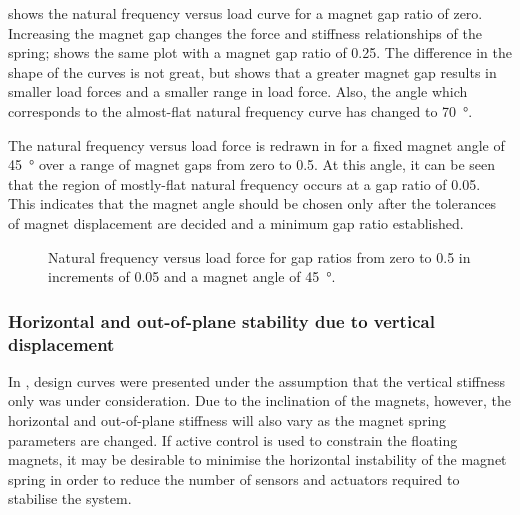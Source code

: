 \documentclass[11pt,a4paper]{memoir}
\begin{document}
 shows the natural frequency versus load curve for a magnet gap ratio of zero.
Increasing the magnet gap changes the force and stiffness relationships of the spring;  shows the same plot with a magnet gap ratio of \num{0.25}.
The difference in the shape of the curves is not great, but  shows that a greater magnet gap results in smaller load forces and a smaller range in load force.
Also, the angle which corresponds to the almost-flat natural frequency curve has changed to \SI{70}{\degree}.

The natural frequency versus load force is redrawn in  for a fixed magnet angle of \SI{45}{\degree} over a range of magnet gaps from zero to \num{0.5}.
At this angle, it can be seen that the region of mostly-flat natural frequency occurs at a gap ratio of \num{0.05}.
This indicates that the magnet angle should be chosen only after the tolerances of magnet displacement are decided and a minimum gap ratio established.

\begin{figure}
\centering
{}
\caption{Natural frequency versus load force for gap ratios from zero to \num{0.5} in increments of \num{0.05} and a magnet angle of \SI{45}{\degree}.}
\end{figure}



\subsubsection{Horizontal and out-of-plane stability due to vertical displacement}

In , design curves were presented under the assumption that the vertical stiffness only was under consideration.
Due to the inclination of the magnets, however, the horizontal and out-of-plane stiffness will also vary as the magnet spring parameters are changed.
If active control is used to constrain the floating magnets, it may be desirable to minimise the horizontal instability of the magnet spring in order to reduce the number of sensors and actuators required to stabilise the system.
\end{document}

